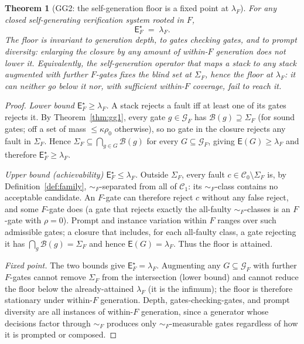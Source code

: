 \documentclass[11pt]{article}
\newtheorem{theorem}{Theorem}
\theoremstyle{definition}
\theoremstyle{remark}
\newcommand{\C}{\mathcal{C}}
\newcommand{\Cgood}{\C_{1}}
\newcommand{\Cbad}{\C_{0}}
\newcommand{\simF}{\sim_{F}}
\newcommand{\SigF}{\Sigma_{F}}
\newcommand{\lF}{\lambda_{F}}
\newcommand{\B}{\mathcal{B}}
\newcommand{\E}{\mathsf{E}}
\begin{document}
\begin{theorem}[GG2: the self-generation floor is a fixed point at $\lF$]\label{thm:gg2}
For any closed self-generating verification system rooted in $F$,
\[
  \E^\star_F \;=\; \lF .
\]
The floor is invariant to generation depth, to gates checking gates, and to prompt diversity:
enlarging the closure by any amount of within-$F$ generation does not lower it. Equivalently, the
self-generation operator that maps a stack to any stack augmented with further $F$-gates fixes the
blind set at $\SigF$, hence the floor at $\lF$: it can neither go below it nor, with sufficient
within-$F$ coverage, fail to reach it.
\end{theorem}

\begin{proof}
\emph{Lower bound $\E^\star_F\ge\lF$.} A stack rejects a fault iff at least one of its gates rejects
it. By Theorem~\ref{thm:gg1}, every gate $g\in\mathcal{G}_F$ has $\B(g)\supseteq\SigF$ (for sound
gates; off a set of mass $\le\kappa\rho_0$ otherwise), so no gate in the closure rejects any fault in
$\SigF$. Hence $\SigF\subseteq\bigcap_{g\in G}\B(g)$ for every $G\subseteq\mathcal{G}_F$, giving
$\E(G)\ge\lF$ and therefore $\E^\star_F\ge\lF$.

\emph{Upper bound (achievability) $\E^\star_F\le\lF$.} Outside $\SigF$, every fault $c\in\Cbad
\setminus\SigF$ is, by Definition~\ref{def:family}, $\simF$-separated from all of $\Cgood$: its
$\simF$-class contains no acceptable candidate. An $F$-gate can therefore reject $c$ without any
false reject, and some $F$-gate does (a gate that rejects exactly the all-faulty $\simF$-classes is
an $F$-gate with $\rho=0$). Prompt and instance variation within $F$ ranges over such admissible
gates; a closure that includes, for each all-faulty class, a gate rejecting it has
$\bigcap_{g}\B(g)=\SigF$ and hence $\E(G)=\lF$. Thus the floor is attained.

\emph{Fixed point.} The two bounds give $\E^\star_F=\lF$. Augmenting any $G\subseteq\mathcal{G}_F$
with further $F$-gates cannot remove $\SigF$ from the intersection (lower bound) and cannot reduce
the floor below the already-attained $\lF$ (it is the infimum); the floor is therefore stationary
under within-$F$ generation. Depth, gates-checking-gates, and prompt diversity are all instances of
within-$F$ generation, since a generator whose decisions factor through $\simF$ produces only
$\simF$-measurable gates regardless of how it is prompted or composed.
\end{proof}
\end{document}
